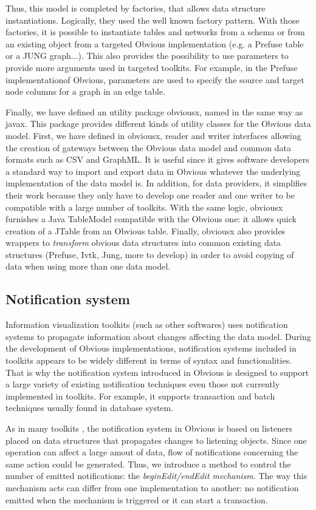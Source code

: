 Thus, this model is completed by factories, that allows data structure instantiations. Logically, they used the well known factory pattern. With those factories, it is possible to instantiate tables and networks from a schema or from an existing object from a targeted Obvious implementation (e.g. a Prefuse table or a JUNG graph...). This also provides the possibility to use parameters to provide more arguments used in targeted toolkits. For example, in the Prefuse implementationof Obvious, parameters are used to specify the source and target node columns for a graph in an edge table.

Finally, we have defined an utility package obviousx, named in the same way as javax. This package provides different kinds of utility classes for the Obvious data model. First, we have defined in obviousx, reader and writer interfaces allowing the creation of gateways between the Obvious data model and common data formats such as CSV and GraphML. It is useful since it gives software developers a standard way to import and export data in Obvious whatever the underlying implementation of the data model is. In addition, for data providers, it simplifies their work because they only have to develop one reader and one writer to be compatible with a large number of toolkits. With the same logic, obviousx furnishes a Java TableModel compatible with the Obvious one: it allows quick creation of a JTable from an Obvious
table. Finally, obviousx also provides wrappers to \emph{transform} obvious data structures into common existing data structures (Prefuse, Ivtk, Jung, more to develop) in order to avoid copying of data when using more than one data model.
 
\subsection{Notification system}

Information visualization toolkits (such as other softwares) uses notification systems to propagate information about changes affecting the data model. During the development of Obvious implementations, notification systems included in toolkits appears to be widely different in terms of syntax and functionalities. That is why the notification system introduced in Obvious is designed to support a large variety of existing notification techniques even those not currently implemented in toolkits. For example, it supports transaction and batch techniques usually found in database system.

As in many toolkits \cite{Prefuse,InfoVis,jung2003}, the notification system in Obvious is based on listeners placed on data structures that propagates changes to listening objects. Since one operation can affect a large amout of data, flow of notifications concerning the same action could be generated. Thus, we introduce a method to control the number of emitted notifications: the \emph{beginEdit/endEdit mechanism}. The way this mechanism acts can differ from one implementation to another: no notification emitted when the mechanism is triggered or it can start a transaction.
